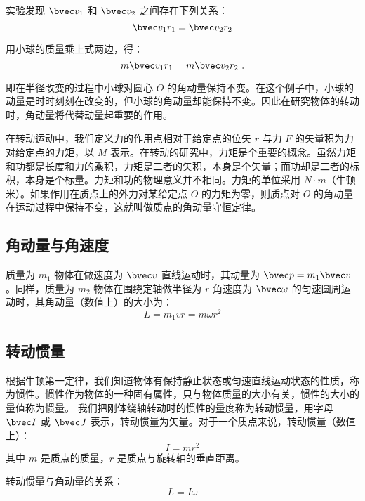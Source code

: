 实验发现 $\bvec v_1$ 和 $\bvec v_2$ 之间存在下列关系：
\begin{equation}
\bvec v_1r_1=\bvec v_2r_2
\end{equation}

用小球的质量乘上式两边，得：
\begin{equation}
m\bvec v_1r_1=m\bvec v_2r_2~.
\end{equation}

即在半径改变的过程中小球对圆心 $O$ 的角动量保持不变。在这个例子中，小球的动量是时时刻刻在改变的，但小球的角动量却能保持不变。因此在研究物体的转动时，角动量将代替动量起重要的作用。

在转动运动中，我们定义力的作用点相对于给定点的位矢 $r$ 与力 $F$ 的矢量积为力对给定点的力矩，以 $M$ 表示。在转动的研究中，力矩是个重要的概念。虽然力矩和功都是长度和力的乘积，力矩是二者的矢积，本身是个矢量；而功却是二者的标积，本身是个标量。力矩和功的物理意义并不相同。力矩的单位采用 $N\cdot m$（牛顿米）。如果作用在质点上的外力对某给定点 $O$ 的力矩为零，则质点对 $O$ 的角动量在运动过程中保持不变，这就叫做质点的角动量守恒定律。
\subsection{角动量与角速度}
质量为 $m_1$ 物体在做速度为 $\bvec v$ 直线运动时，其动量为 $\bvec p=m_1\bvec v$。同样，质量为 $m_2$ 物体在围绕定轴做半径为 $r$ 角速度为 $\bvec \omega$ 的匀速圆周运动时，其角动量（数值上）的大小为：
\begin{equation}
L=m_1vr=m\omega r^2
\end{equation}
\subsection{转动惯量}
根据牛顿第一定律，我们知道物体有保持静止状态或匀速直线运动状态的性质，称为惯性。惯性作为物体的一种固有属性，只与物体质量的大小有关，惯性的大小的量值称为惯量。
我们把刚体绕轴转动时的惯性的量度称为转动惯量，用字母 $\bvec I$ 或 $\bvec J$ 表示，转动惯量为矢量。对于一个质点来说，转动惯量（数值上）：
\begin{equation}
I=mr^{2}
\end{equation}
其中 $m$ 是质点的质量，$r$ 是质点与旋转轴的垂直距离。

转动惯量与角动量的关系：
\begin{equation}
L=I\omega
\end{equation}

